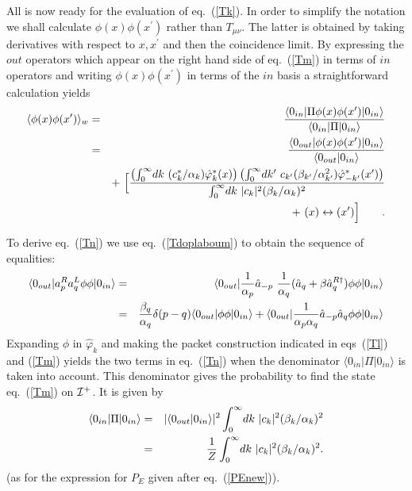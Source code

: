 \documentclass[12pt,oneside]{report}
\def\ket#1{|#1\rangle}
\def\bra#1{\langle #1|}
\def\p {\prime}
\begin{document}
All is now ready for the evaluation of eq.~(\ref{Tk}). In order to simplify the
notation we shall calculate $\phi(x)\phi(x^\p)$ rather than $T_{\mu\nu}$. The
latter is obtained by taking derivatives with respect to $x,x^\p$ and then the
coincidence  limit. By expressing the $out$ operators which appear on the
right hand side of eq.~(\ref{Tm}) in terms of $in$ operators and writing
$\phi(x)\phi(x^\p)$ in terms of the $in$ basis a straightforward calculation
yields 
 \begin{eqnarray} \langle
\phi(x) \phi(x^\p) \rangle_w &=& {\bra{0_{in}} \Pi \phi(x) \phi(x^\p)
 \ket{0_{in}}\over   \bra{0_{in}} \Pi  \ket{0_{in}} }\nonumber\\
 &=& {
\bra{0_{out}} \phi(x) \phi(x^\p)
\ket{0_{in}}
\over
\bra{0_{out}} 0_{in}\rangle }
\nonumber\\
&\ &+ \ 
\Bigl[{
\left(\int_0^\infty \! dk\ 
(c^*_k/\alpha_k)  \hat\varphi^*_k(x)\right)\left(
\int_0^\infty \! dk^\p\ 
c_{k^\p} (\beta_{k^\p} / \alpha_{k^\p}^2 )
 \hat\varphi^*_{-k^\p}(x^\p)\right)
\over 
\int_0^\infty \! dk\ 
\vert c_k \vert^2 ( \beta_k /\alpha_k)^2
}\nonumber \\
&&\quad +\ (x)\leftrightarrow(x^\p)\Bigr]\qquad .
\label{Tn}
\end{eqnarray}
 
To derive eq.~(\ref{Tn}) we use eq.~(\ref{Tdoplaboum}) to obtain the sequence of
equalities: 
 \begin{eqnarray}
\bra{0_{out}} a^R_pa^L_q\phi \phi\ket{0_{in}} &=&
\bra{0_{out}}{1\over \alpha_p}\hat  a_{-p}\ {1\over \alpha_q} (\hat a_q+\beta 
\hat a^{R\dagger}_q)
\phi \phi\ket{0_{in}}\nonumber \\
&=& 
{\beta_q\over \alpha_q}\delta (p-q)
\bra{0_{out}}\phi \phi\ket{0_{in}} +
\bra{0_{out}}{1\over {\alpha_p \alpha_q}}\hat a_{-p}
\hat a_q \phi \phi\ket{0_{in}}
\nonumber \\
\label{333}
\end{eqnarray}
Expanding $\phi$ in $\hat \varphi_k$ and making the packet construction 
indicated in 
eqs~(\ref{Tl}) and (\ref{Tm}) yields the two terms in eq.~(\ref{Tn}) when the
denominator  $ \bra{0_{in}} \Pi  \ket{0_{in}}$ is taken into
account. 
This denominator gives the probability to find the state eq.~(\ref{Tm})
on ${\cal{I}}^+$. It is given by
\begin{eqnarray}
 \bra{0_{in}} \Pi  \ket{0_{in}}&=& 
\vert \bra{0_{out}} 0_{in}\rangle \vert^2
\int_0^{\infty}\!dk\ \vert c_k \vert^2 (\beta_k/\alpha_k)^2
\nonumber \\
&=&{1 \over Z}\int_0^{\infty}\!dk\ \vert c_k \vert^2 (\beta_k/\alpha_k)^2.
\end{eqnarray}
(as for the expression for $P_E$ given after eq.~(\ref{PEnew})).
\end{document}
